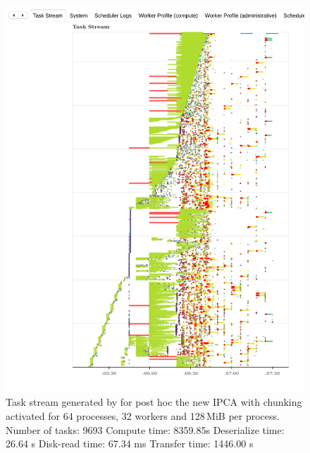 \begin{figure}[t]\centering
\includegraphics[width=\columnwidth]{figures/P64_W32_D128_DASK_ISIPCA.pdf}
\caption{Task stream generated by \dask for post hoc the new IPCA with chunking activated for 64 processes, 32 workers and 128\,MiB per process. 
    Number of tasks: 9693
    Compute time: 8359.85s
    Deserialize time: 26.64 s
    Disk-read time: 67.34 ms
    Transfer time: 1446.00 s
}
\label{fig:taskstreamdask3}
\end{figure}


